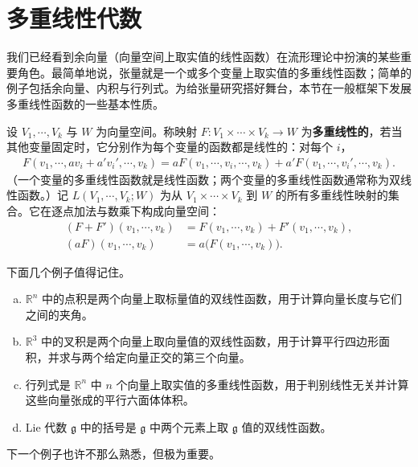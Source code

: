 \documentclass[../../main.tex]{subfiles}
\begin{document}
\section{多重线性代数}\label{section:ch12-多重线性代数}

我们已经看到余向量（向量空间上取实值的线性函数）在流形理论中扮演的某些重要角色。最简单地说，张量就是一个或多个变量上取实值的多重线性函数；简单的例子包括余向量、内积与行列式。为给张量研究搭好舞台，本节在一般框架下发展多重线性函数的一些基本性质。

设 $V_1,\cdots ,V_k$ 与 $W$ 为向量空间。称映射 $F\colon V_1\times\cdots\times V_k\to W$ 为\textbf{多重线性的}，若当其他变量固定时，它分别作为每个变量的函数都是线性的：对每个 $i$，
\begin{align}
F(v_1,\cdots ,a v_i+a'v_i',\cdots ,v_k)
=aF(v_1,\cdots ,v_i,\cdots ,v_k)+a'F(v_1,\cdots ,v_i',\cdots ,v_k).\label{align:ch12-多重线性}
\end{align}
（一个变量的多重线性函数就是线性函数；两个变量的多重线性函数通常称为双线性函数。）记 $L(V_1,\cdots ,V_k;W)$ 为从 $V_1\times\cdots\times V_k$ 到 $W$ 的所有多重线性映射的集合。它在逐点加法与数乘下构成向量空间：
\begin{align*}
(F+F')(v_1,\cdots ,v_k)&=F(v_1,\cdots ,v_k)+F'(v_1,\cdots ,v_k),\\
(aF)(v_1,\cdots ,v_k)&=a\big(F(v_1,\cdots ,v_k)\big).
\end{align*}

下面几个例子值得记住。

\begin{example}[一些熟悉的多重线性函数]\label{example:ch12-熟悉多重线性}
\begin{enumerate}[(a)]
\item $\mathbb{R}^n$ 中的点积是两个向量上取标量值的双线性函数，用于计算向量长度与它们之间的夹角。
\item $\mathbb{R}^3$ 中的叉积是两个向量上取向量值的双线性函数，用于计算平行四边形面积，并求与两个给定向量正交的第三个向量。
\item 行列式是 $\mathbb{R}^n$ 中 $n$ 个向量上取实值的多重线性函数，用于判别线性无关并计算这些向量张成的平行六面体体积。
\item Lie 代数 $\mathfrak g$ 中的括号是 $\mathfrak g$ 中两个元素上取 $\mathfrak g$ 值的双线性函数。
\end{enumerate}
\end{example}

下一个例子也许不那么熟悉，但极为重要。
\end{document}

